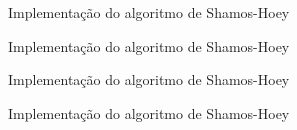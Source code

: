 \begin{frame}[fragile]{Implementação do algoritmo de Shamos-Hoey}
\end{frame}

\begin{frame}[fragile]{Implementação do algoritmo de Shamos-Hoey}
\end{frame}

\begin{frame}[fragile]{Implementação do algoritmo de Shamos-Hoey}
\end{frame}

\begin{frame}[fragile]{Implementação do algoritmo de Shamos-Hoey}
\end{frame}
































































































































